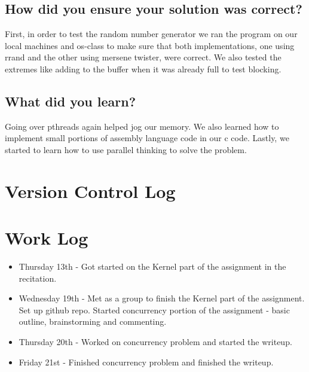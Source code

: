 \documentclass[letterpaper,10pt,titlepage, onecolumn, compsoc]{IEEEtran}
\begin{document}
\subsection{How did you ensure your solution was correct?}
First, in order to test the random number generator we ran the program on our local machines and os-class to make sure that both implementations, one using rrand and the other using mersene twister, were correct. We also tested the extremes like adding to the buffer when  it was already full to test blocking. 

\subsection{What did you learn?}
Going over pthreads again helped jog our memory. We also learned how to implement small portions of assembly language code in our c code. Lastly, we started to learn how to use parallel thinking to solve the problem. 


\section{Version Control Log}


\section{Work Log}
\begin{itemize}
\item Thursday 13th - Got started on the Kernel part of the assignment in the recitation.
\item Wednesday 19th - Met as a group to finish the Kernel part of the assignment. Set up github repo. Started concurrency portion of the assignment - basic outline, brainstorming and commenting.
\item Thursday 20th - Worked on concurrency problem and started the writeup. 
\item Friday 21st - Finished concurrency problem and finished the writeup.
\end{itemize}
\end{document}
